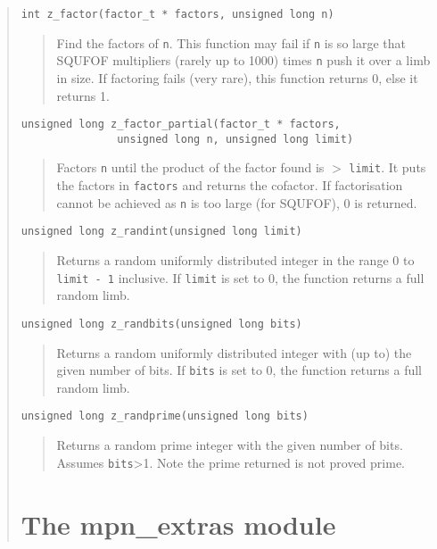 \documentclass[a4paper,10pt]{article}
\newcommand{\code}{\lstinline}
\begin{document}
\begin{quote}
\begin{lstlisting}
int z_factor(factor_t * factors, unsigned long n)
\end{lstlisting}
\begin{quote}
Find the factors of \code{n}.  This function may fail if \code{n} is so large that SQUFOF multipliers (rarely up to 1000) times \code{n} push it over a limb in size.  If factoring fails (very rare), this function returns 0, else it returns 1.  
\end{quote}

\begin{lstlisting}
unsigned long z_factor_partial(factor_t * factors,
               unsigned long n, unsigned long limit)
\end{lstlisting}
\begin{quote}
Factors \code{n} until the product of the factor found is $>$ \code{limit}. It puts the factors in \code{factors} and returns the cofactor.  If factorisation cannot be achieved as \code{n} is too large (for SQUFOF), 0 is returned.  
\end{quote}

\begin{lstlisting}
unsigned long z_randint(unsigned long limit)
\end{lstlisting}
\begin{quote}
Returns a random uniformly distributed integer in the range 0 to \code{limit - 1} inclusive. If \code{limit} is set to 0, the function returns a full random limb.
\end{quote}
 
\begin{lstlisting}
unsigned long z_randbits(unsigned long bits)
\end{lstlisting}
\begin{quote}
Returns a random uniformly distributed integer with (up to) the given number of bits. If \code{bits} is set to 0, the function returns a full random limb.
\end{quote}

\begin{lstlisting}
unsigned long z_randprime(unsigned long bits)
\end{lstlisting}
\begin{quote}
Returns a random prime integer with the given number of bits.  Assumes \code{bits}>1. Note the prime returned is not proved prime.
\end{quote}

\section{The mpn\_extras module}


\end{quote}
\end{document}
